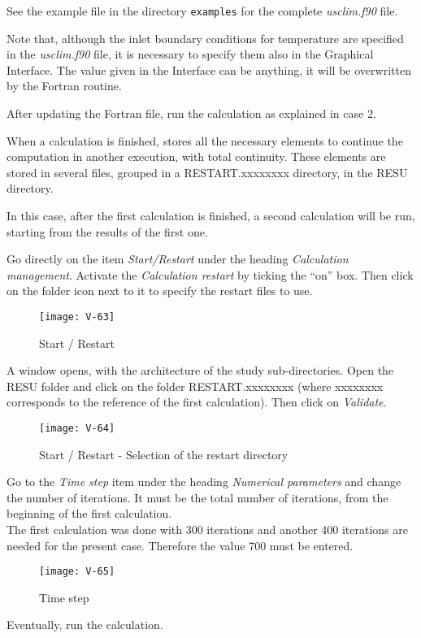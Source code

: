 See the example file in the directory \texttt{examples} for the complete
{\itshape usclim.f90} file.

Note that, although the inlet boundary conditions for temperature are specified
in the {\itshape usclim.f90} file, it is necessary to specify them also in the
Graphical Interface. The value given in the Interface can be anything, it will
be overwritten by the Fortran routine.

After updating the Fortran file, run the calculation as explained in case
2.


\newpage
When a calculation is finished, \CS stores all the necessary elements to
continue the computation in another execution, with total continuity. These
elements are stored in several files, grouped in a RESTART.xxxxxxxx directory, in
the RESU directory.

In this case, after the first calculation is finished, a second calculation will
be run, starting from the results of the first one.


Go directly on the item {\itshape Start/Restart} under the heading
{\itshape Calculation management}.  Activate the {\itshape Calculation restart}
by ticking the ``on'' box. Then click on the folder icon next to it to specify
the restart files to use.

\begin{figure}[h!]
\begin{center}
\texttt{[image: V-63]}
\caption{Start / Restart}
\label{fig4_e3}
\end{center}
\end{figure}


\newpage
A window opens, with the architecture of the study sub-directories. Open the
RESU folder and click on the folder RESTART.xxxxxxxx (where xxxxxxxx corresponds
to the reference of the first calculation). Then click on {\itshape Validate}.

\begin{figure}[h!]
\begin{center}
\texttt{[image: V-64]}
\caption{Start / Restart - Selection of the restart directory}
\label{fig5_e3}
\end{center}
\end{figure}


\newpage
Go to the {\itshape Time step} item under the heading {\itshape Numerical parameters} and change the number of iterations. It must be the total number of
iterations, from the beginning of the first calculation.\\

The first calculation was done with 300 iterations and another 400 iterations
are needed for the present case. Therefore the value 700 must be entered.

\begin{figure}[h!]
\begin{center}
\texttt{[image: V-65]}
\caption{Time step}
\label{fig6_e3}
\end{center}
\end{figure}

Eventually, run the calculation.
